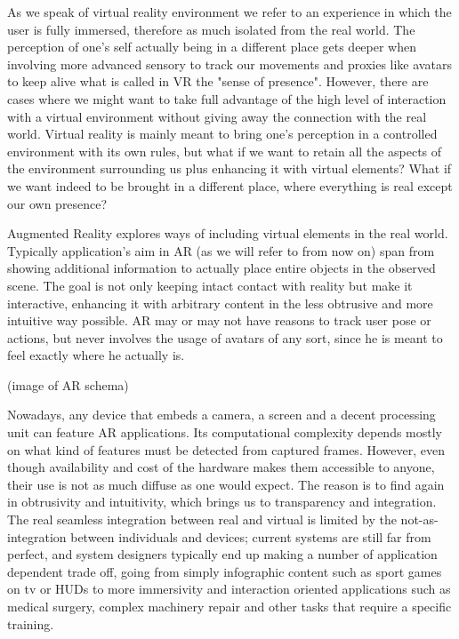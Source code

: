As we speak of virtual reality environment we refer to an experience in which the user is fully immersed, therefore as much isolated from the real world. The perception of one's self actually being in a different place gets deeper when involving more advanced sensory to track our movements and proxies like avatars to keep alive what is called in VR the "sense of presence". However, there are cases where we might want to take full advantage of the high level of interaction with a virtual environment without giving away the connection with the real world. Virtual reality is mainly meant to bring one's perception in a controlled environment with its own rules, but what if we want to retain all the aspects of the environment surrounding us plus enhancing it with virtual elements? What if we want indeed to be brought in a different place, where everything is real except our own presence?

Augmented Reality explores ways of including virtual elements in the real world. Typically application's aim in AR (as we will refer to from now on) span from showing additional information to actually place entire objects in the observed scene. The goal is not only keeping intact contact with reality but make it interactive, enhancing it with arbitrary content in the less obtrusive and more intuitive way possible. AR may or may not have reasons to track user pose or actions, but never involves the usage of avatars of any sort, since he is meant to feel exactly where he actually is.

(image of AR schema)

Nowadays, any device that embeds a camera, a screen and a decent processing unit can feature AR applications. Its computational complexity depends mostly on what kind of features must be detected from captured frames. However, even though availability and cost of the hardware makes them accessible to anyone, their use is not as much diffuse as one would expect. The reason is to find again in obtrusivity and intuitivity, which brings us to transparency and integration. The real seamless integration between real and virtual is limited by the not-as-integration between individuals and devices; current systems are still far from perfect, and system designers typically end up making a number of application dependent trade off, going from simply infographic content such as sport games on tv or HUDs to more immersivity and interaction oriented applications such as medical surgery, complex machinery repair and other tasks that require a specific training.

